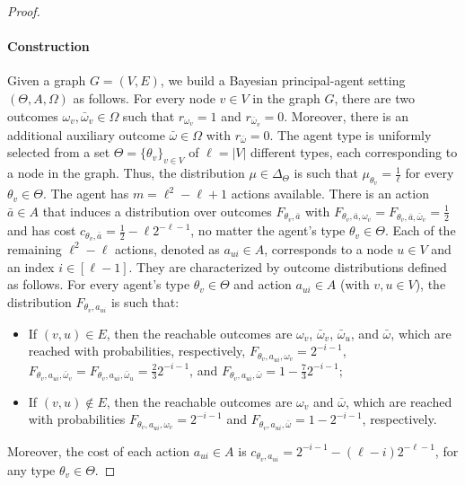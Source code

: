 \begin{proof}
	\paragraph{Construction}
	Given a graph $G=(V,E)$, we build a Bayesian principal-agent setting $(\Theta, A, \Omega)$ as follows.
	For every node $v \in V$ in the graph $G$, there are two outcomes $\omega_v, \bar \omega_v \in \Omega$ such that $r_{\omega_v} = 1 $ and $r_{\bar \omega_v} = 0$.
	Moreover, there is an additional auxiliary outcome $\bar \omega \in \Omega$ with $r_{\bar \omega} = 0$.
	The agent type is uniformly selected from a set $\Theta = \{ \theta_v \}_{v \in V}$ of $\ell = |V|$ different types, each corresponding to a node in the graph.
	Thus, the distribution $\mu \in \Delta_{\Theta}$ is such that $\mu_{\theta_v} = \frac{1}{\ell}$ for every $\theta_v \in \Theta$.
	The agent has $m = \ell^2-\ell+1$ actions available.
	There is an action $\bar a \in A$ that induces a distribution over outcomes $F_{\theta_v, \bar a}$ with $F_{\theta_v, \bar a, \omega_v} =F_{\theta_v, \bar a, \bar \omega_v} = \frac{1}{2}$ and has cost $c_{\theta_v, \bar a} = \frac{1}{2} - \ell 2^{-\ell-1}$, no matter the agent's type $\theta_v \in \Theta$.
	Each of the remaining $\ell^2 - \ell$ actions, denoted as $a_{ui} \in A$, corresponds to a node $u \in V$ and an index $i \in [\ell-1]$.
	They are characterized by outcome distributions defined as follows.
	For every agent's type $\theta_v \in \Theta$ and action $a_{ui} \in A$ (with $v,u \in V$), the distribution $F_{\theta_v, a_{ui}}$ is such that:
	\begin{itemize}
		\item If $(v,u) \in E$, then the reachable outcomes are $\omega_v$, $\bar \omega_v$, $\bar \omega_{u}$, and $\bar \omega$, which are reached with probabilities, respectively, $F_{\theta_v,a_{ui}, \omega_v}=2^{-i-1}$, $F_{\theta_v,a_{ui},\bar \omega_v}=F_{\theta_v,a_{ui},\bar \omega_{u}}=\frac{2}{3}2^{-i-1}$, and $F_{\theta_v,a_{ui},\bar \omega}= 1-\frac{7}{3}2^{-i-1}$;
		\item If $(v,u) \notin E$, then the reachable outcomes are $\omega_v$ and $\bar \omega$, which are reached with probabilities $F_{\theta_v,a_{ui},\omega_v}=2^{-i-1}$ and $F_{\theta_v,a_{ui},\bar \omega}= 1-2^{-i-1}$, respectively.
	\end{itemize}
	Moreover, the cost of each action $a_{ui} \in A$ is $c_{\theta_v,a_{ui}}=2^{-i-1}-(\ell-i) 2^{-\ell-1}$, for any type $\theta_v \in \Theta$.
	
	

\end{proof}
